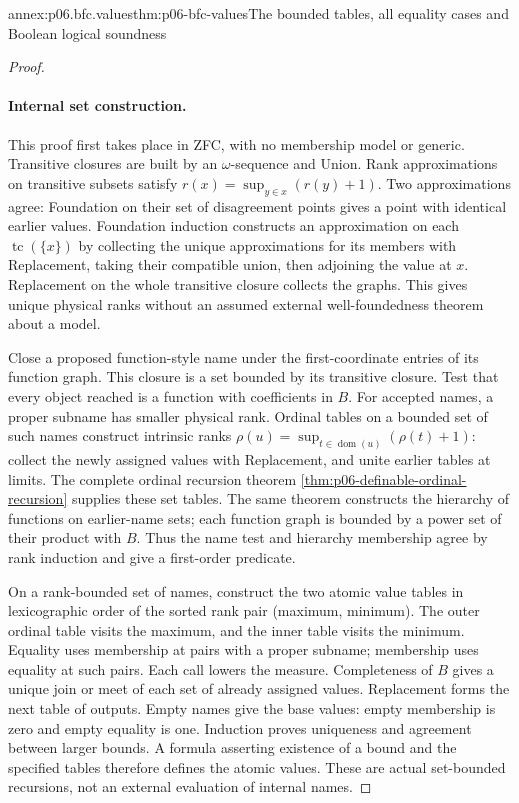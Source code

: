 \begin{annexitem}{annex:p06.bfc.values}{thm:p06-bfc-values}{The bounded tables, all equality cases and Boolean logical soundness}
\begin{proof}
\paragraph{Internal set construction.}
This proof first takes place in ZFC, with no membership model or generic.
Transitive closures are built by an \(\omega\)-sequence and Union.
Rank approximations on transitive subsets satisfy
\(r(x)=\sup_{y\in x}(r(y)+1)\). Two approximations agree: Foundation
on their set of disagreement points gives a point with identical earlier
values. Foundation induction constructs an approximation on each
\(\operatorname{tc}(\{x\})\) by collecting the unique approximations
for its members with Replacement, taking their compatible union, then
adjoining the value at \(x\). Replacement on the whole transitive closure
collects the graphs. This gives unique physical ranks without an assumed
external well-foundedness theorem about a model.

Close a proposed function-style name under the first-coordinate entries
of its function graph. This closure is a set bounded by its transitive
closure. Test that every object reached is a function with coefficients
in \(B\). For accepted names, a proper subname has smaller physical rank.
Ordinal tables on a bounded set of such names construct intrinsic ranks
\(\rho(u)=\sup_{t\in\operatorname{dom}(u)}(\rho(t)+1)\): collect the
newly assigned values with Replacement, and unite earlier tables at
limits. The complete ordinal recursion theorem
\cref{thm:p06-definable-ordinal-recursion} supplies these set tables.
The same theorem constructs the hierarchy of functions on earlier-name
sets; each function graph is bounded by a power set of their product
with \(B\). Thus the name test and hierarchy membership agree by rank
induction and give a first-order predicate.

On a rank-bounded set of names, construct the two atomic value tables in
lexicographic order of the sorted rank pair (maximum, minimum).
The outer ordinal table visits the maximum, and the inner table visits
the minimum. Equality uses membership at pairs with a proper subname;
membership uses equality at such pairs. Each call lowers the measure.
Completeness of \(B\) gives a unique join or meet of each set of
already assigned values. Replacement forms the next table of outputs.
Empty names give the base values: empty membership is zero and empty
equality is one. Induction proves uniqueness and agreement between
larger bounds. A formula asserting existence of a bound and the specified
tables therefore defines the atomic values. These are actual set-bounded
recursions, not an external evaluation of internal names.


\end{proof}
\end{annexitem}

